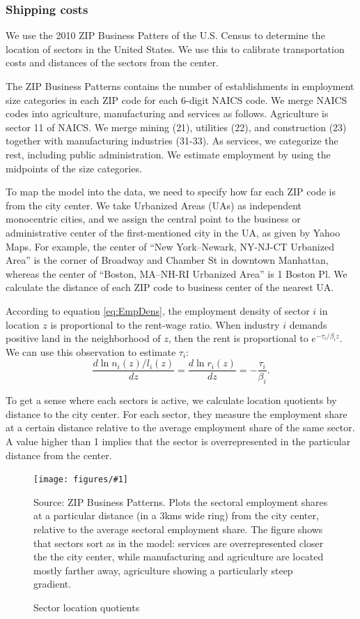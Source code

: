 \documentclass[12pt]{article}
\newcommand{\dofigure}[3]{\begin{figure}
\begin{centering}
\texttt{[image: figures/\#1]}
  \caption{#2\label{fig:#1}}
\end{centering}

\noindent \footnotesize{#3}
\end{figure}}
\begin{document}
\subsubsection{Shipping costs}

We use the 2010 ZIP Business Patters of the U.S. Census to determine the location of sectors in the United States. We use this to calibrate transportation costs and distances of the sectors from the center.

The ZIP Business Patterns contains the number of establishments in employment size categories in each ZIP code for each 6-digit NAICS code. We merge NAICS codes into agriculture, manufacturing and services as follows. Agriculture is sector 11 of NAICS. We merge mining (21), utilities (22), and construction (23) together with manufacturing industries (31-33). As services, we categorize the rest, including public administration. We estimate employment by using the midpoints of the size categories.

To map the model into the data, we need to specify how far each ZIP code is from the city center. We take Urbanized Areas (UAs) as independent monocentric cities, and we assign the central point to the business or administrative center of the first-mentioned city in the UA, as given by Yahoo Maps. For example, the center of ``New York–Newark, NY-NJ-CT Urbanized Area'' is the corner of Broadway and Chamber St in downtown Manhattan, whereas the center of ``Boston, MA–NH-RI Urbanized Area'' is 1 Boston Pl. We calculate the distance of each ZIP code to business center of the nearest UA.

According to equation \ref{eq:EmpDens}, the employment density of sector $i$ in location $z$ is proportional to the rent-wage ratio. When industry $i$ demands positive land in the neighborhood of $z$, then the rent is proportional to $e^{-\tau_i/\beta_i z}$. We can use this observation to estimate $\tau_i$:
\[
\frac{d\ln n_i(z)/l_i(z)}{dz} =\frac{d\ln r_i(z)}{dz} = -\frac{\tau_i}{\beta_i}.
\]

To get a sense where each sectors is active, we calculate location quotients by distance to the city center. For each sector, they measure the employment share at a certain distance relative to the average employment share of the same sector. A value higher than 1 implies that the sector is overrepresented in the particular distance from the center.

\dofigure{sector_location_quotients}{Sector location quotients}{Source: ZIP Business Patterns. Plots the sectoral employment shares at a particular distance (in a 3kms wide ring) from the city center, relative to the average sectoral employment share. The figure shows that sectors sort as in the model: services are overrepresented closer the the city center, while manufacturing and agriculture are located mostly farther away, agriculture showing a particularly steep gradient.}
\end{document}
